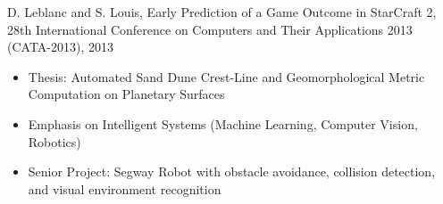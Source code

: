 \documentclass[10pt,a4paper,ragged2e,withhyper]{altacv}
\begin{document}
\begin{paracol}{2}
		
		D. Leblanc and S. Louis, Early Prediction of a Game Outcome in StarCraft 2, 28th
		International Conference on Computers and Their Applications 2013 (CATA-2013),
		2013

		

		\switchcolumn
		
		
		
		\divider
		
		
		\divider
		
		
		\divider
		
		

		
		\begin{itemize}
			\item Thesis: Automated Sand Dune Crest-Line and Geomorphological Metric Computation on Planetary Surfaces
		\end{itemize}
		\divider
		
		\begin{itemize}
			\item Emphasis on Intelligent Systems (Machine Learning, Computer Vision, Robotics)
			\item Senior Project: Segway Robot with obstacle avoidance, collision detection, and visual environment recognition
		\end{itemize}
	

\end{paracol}
\end{document}
